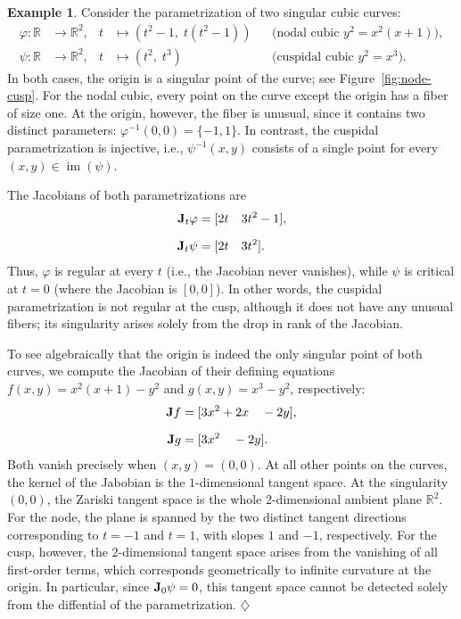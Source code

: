 \documentclass{article} %
\theoremstyle{plain}%
\theoremstyle{definition}
\newtheorem{exmp}[thm]{Example}
\theoremstyle{remark}
\newcommand{\jacob}{\textnormal{\textbf{J}}}
\begin{document}
\begin{exmp}
 Consider the parametrization of two singular cubic curves:
\begin{align}
  \varphi \colon \mathbb{R} &\to \mathbb{R}^2, & 
  t &\mapsto (t^2 - 1,\; t(t^2 - 1)) 
  && \text{(nodal cubic $y^2 = x^2(x+1)$)}, \label{eq:nodal-param} \\[6pt]
  \psi \colon \mathbb{R} &\to \mathbb{R}^2, & 
  t &\mapsto (t^2,\; t^3) 
  && \text{(cuspidal cubic $y^2 = x^3$)}. \label{eq:cuspidal-param}
\end{align}
In both cases, the origin is a singular point of the curve; see Figure~\ref{fig:node-cusp}.
For the nodal cubic, every point on the curve except the origin has a fiber of size one. 
At the origin, however, the fiber is unusual, since it contains two distinct parameters:
$
  \varphi^{-1}(0,0) = \{-1,1\}.
$
In contrast, the cuspidal parametrization is injective, i.e.,  $\psi^{-1}(x,y)$ consists of a single point for every  $(x,y)\in \operatorname{im}(\psi)$.

  The Jacobians of both parametrizations are
\begin{align}
  \jacob_t\varphi &= [ 2t\quad3t^2-1], \label{eq:dphi}\\[6pt]
  \jacob_t\psi &= [2t\quad3t^2]. \label{eq:dpsi}
\end{align}
Thus, $\varphi$ is regular at every $t$ (i.e., the Jacobian never vanishes), while $\psi$ is critical at $t=0$ 
(where the Jacobian is $[0,0]$).
In other words, the cuspidal parametrization is not regular at the cusp, although it does not have any unusual fibers; its singularity arises solely from the drop in rank of the Jacobian.

To see algebraically that the origin is indeed the only singular point of both curves, we compute the Jacobian of their defining equations $f(x,y) =x^2(x+1)-y^2 $ and $g(x,y) = x^3-y^2$, respectively:
\begin{align}
  \jacob f &= [ 3x^2+2x\quad-2y], \\[6pt]
  \jacob g &= [3x^2\quad-2y]. 
\end{align}
Both vanish precisely when  $(x,y)=(0,0)$.
At all other points on the curves, the kernel of the Jabobian is the $1$-dimensional tangent space.
At the singularity $(0,0)$, 
the Zariski tangent space is the whole $2$-dimensional ambient plane $\mathbb{R}^2$. For the node, the plane is spanned by the two distinct tangent 
directions corresponding to $t=-1$ and $t=1$, with slopes $1$ and $-1$, respectively. 
For the cusp, however, 
the $2$-dimensional tangent space arises from the vanishing of all first-order terms, which corresponds 
geometrically to infinite curvature at the origin. In particular, since $\jacob_0\psi = 0$, this tangent space 
cannot be detected solely from the diffential of the parametrization.  
\hfill $\diamondsuit$
\end{exmp}
\end{document}
